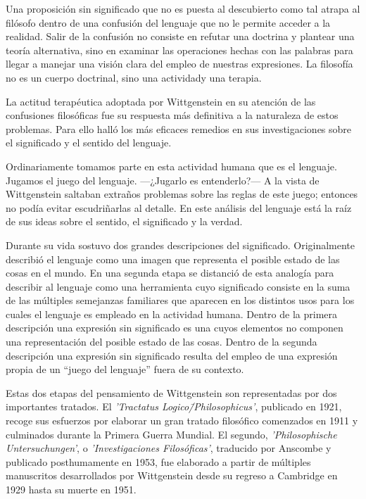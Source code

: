 Una proposición sin significado que no es puesta al descubierto como tal atrapa
al filósofo dentro de una confusión del lenguaje que no le permite acceder a la
realidad. Salir de la confusión no consiste en refutar una doctrina y plantear
una teoría alternativa, sino en examinar las operaciones hechas con las palabras
para llegar a manejar una visión clara del empleo de nuestras expresiones. La
filosofía no es un cuerpo doctrinal, sino una
actividad\autocite[cf.~][4.112]{tractatus}y una
terapia\autocite[cf.~][\S133]{PI}.

La actitud terapéutica adoptada por Wittgenstein en su atención de las
confusiones filosóficas fue su respuesta más definitiva a la naturaleza de estos
problemas. Para ello halló los más eficaces remedios en sus investigaciones
sobre el significado y el sentido del lenguaje.

Ordinariamente tomamos parte en esta actividad humana que es el lenguaje.
Jugamos el juego del lenguaje. ---¿Jugarlo es entenderlo?--- A la vista de
Wittgenstein saltaban extraños problemas sobre las reglas de este juego;
entonces no podía evitar escudriñarlas al
detalle.\autocite[cf.~][loc.7099]{monk} En este análisis del lenguaje está la
raíz de sus ideas sobre el sentido, el significado y la verdad.

Durante su vida sostuvo dos grandes descripciones del significado. Originalmente
describió el lenguaje como una imagen que representa el posible estado de las
cosas en el mundo. En una segunda etapa se distanció de esta analogía para
describir al lenguaje como una herramienta cuyo significado consiste en la suma
de las múltiples semejanzas familiares que aparecen en los distintos usos para
los cuales el lenguaje es empleado en la actividad humana. Dentro de la primera
descripción una expresión sin significado es una cuyos elementos no componen una
representación del posible estado de las cosas. Dentro de la segunda descripción
una expresión sin significado resulta del empleo de una expresión propia de un
``juego del lenguaje'' fuera de su contexto.

Estas dos etapas del pensamiento de Wittgenstein son representadas por dos
importantes tratados. El \emph{'Tractatus Logico\=/Philosophicus'}, publicado en
1921, recoge sus esfuerzos por elaborar un gran tratado filosófico comenzados en
1911 y culminados durante la Primera Guerra Mundial. El segundo,
\emph{'Philosophische Untersuchungen'}, o \emph{'Investigaciones Filosóficas'},
traducido por Anscombe y publicado posthumamente en 1953, fue elaborado a partir
de múltiples manuscritos desarrollados por Wittgenstein desde su regreso a
Cambridge en 1929 hasta su muerte en 1951.

